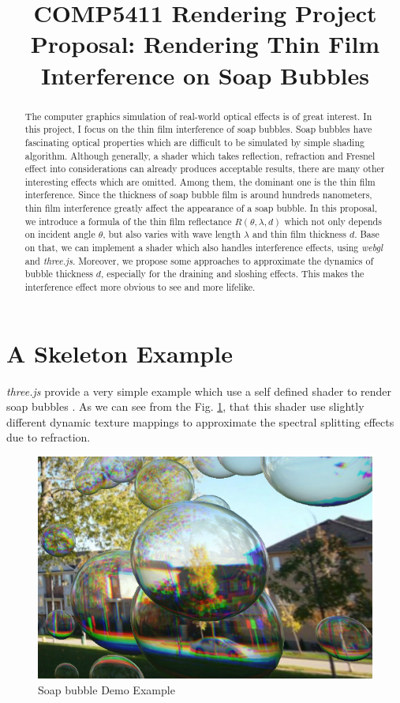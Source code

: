 \documentclass[9pt, conference]{IEEEtran}
\title{COMP5411 Rendering Project Proposal: Rendering Thin Film Interference on Soap Bubbles}
\author{\IEEEauthorblockA{Mucong DING, 20323458\\mcding@connect.ust.hk\\Hong Kong University of Science and Technology}}
\begin{document}
\maketitle
\begin{abstract}
The computer graphics simulation of real-world optical effects is of great interest. In this project, I focus on the thin film interference of soap bubbles. Soap bubbles have fascinating optical properties which are difficult to be simulated by simple shading algorithm. Although generally, a shader which takes reflection, refraction and Fresnel effect into considerations can already produces acceptable results\cite{bubblebase}, there are many other interesting effects which are omitted. Among them, the dominant one is the thin film interference. Since the thickness of soap bubble film is around hundreds nanometers, thin film interference greatly affect the appearance of a soap bubble. In this proposal, we introduce a formula of the thin film reflectance $R(\theta, \lambda, d)$ which not only depends on incident angle $\theta$, but also varies with wave length $\lambda$ and thin film thickness $d$. Base on that, we can implement a shader which also handles interference effects, using \textit{webgl} and \textit{three.js}. Moreover, we propose some approaches to approximate the dynamics of bubble thickness $d$, especially for the draining and sloshing effects. This makes the interference effect more obvious to see and more lifelike.
\end{abstract}

\section{\label{sec1}A Skeleton Example}
\textit{three.js} provide a very simple example which use a self defined shader to render soap bubbles \cite{bubblebase}. As we can see from the Fig. \ref{bubbelbase}, that this shader use slightly different dynamic texture mappings to approximate the spectral splitting effects due to refraction. 

\begin{figure}
	\vspace{-7pt}
	\centering
	\includegraphics[width=0.7\linewidth]{bubble_base.png}
	\vspace{-10pt}
	\caption{\label{bubbelbase}Soap bubble Demo Example\cite{bubblebase}}
	\vspace{-7pt}
\end{figure}
\end{document}
